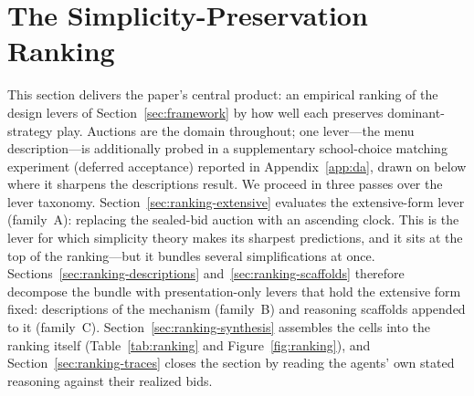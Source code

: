 
\section{The Simplicity-Preservation Ranking}\label{sec:ranking}

This section delivers the paper's central product: an empirical ranking of the
design levers of Section~\ref{sec:framework} by how well each preserves
dominant-strategy play. Auctions are the domain throughout; one lever---the
menu description---is additionally probed in a supplementary school-choice
matching experiment (deferred acceptance) reported in
Appendix~\ref{app:da}, drawn on below where it sharpens the descriptions
result. We proceed in three passes over the
lever taxonomy. Section~\ref{sec:ranking-extensive} evaluates the
extensive-form lever (family~A): replacing the sealed-bid auction with an
ascending clock. This is the lever for which simplicity theory makes its
sharpest predictions, and it sits at the top of the ranking---but it bundles
several simplifications at once. Sections~\ref{sec:ranking-descriptions}
and~\ref{sec:ranking-scaffolds} therefore decompose the bundle with
presentation-only levers that hold the extensive form fixed: descriptions of
the mechanism (family~B) and reasoning scaffolds appended to it (family~C).
Section~\ref{sec:ranking-synthesis} assembles the cells into the ranking
itself (Table~\ref{tab:ranking} and Figure~\ref{fig:ranking}), and
Section~\ref{sec:ranking-traces} closes the section by reading the agents'
own stated reasoning against their realized bids.

